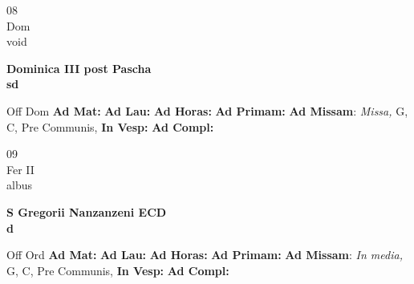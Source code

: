 \documentclass[10pt, openany]{book}
\begin{document}
    \begin{center}
        \begin{minipage}{3.5in}
            \vspace{2em}
            \begin{minipage}{0.5in}
                {\Huge 08} \\
                {\normalsize Dom} \\
                {\normalsize void}
            \end{minipage}
            \begin{minipage}{3.0in}
                \textbf{ \large Dominica III post Pascha \\
                \textnormal{\normalsize sd}} \\ 
            \end{minipage}
            \begin{justify}Off Dom
                \textbf{Ad Mat: }
                \textbf{Ad Lau: }
                \textbf{Ad Horas: }
                \textbf{Ad Primam: }\textbf{Ad Missam}: \textit{Missa,} G, C, Pre Communis,  
                \textbf{In Vesp: }
                \textbf{Ad Compl: }
            \end{justify}
        \end{minipage}
    \end{center}

    \begin{center}
        \begin{minipage}{3.5in}
            \vspace{2em}
            \begin{minipage}{0.5in}
                {\Huge 09} \\
                {\normalsize Fer II} \\
                {\normalsize albus}
            \end{minipage}
            \begin{minipage}{3.0in}
                \textbf{ \large S Gregorii Nanzanzeni ECD \\
                \textnormal{\normalsize d}} \\ 
            \end{minipage}
            \begin{justify}Off Ord
                \textbf{Ad Mat: }
                \textbf{Ad Lau: }
                \textbf{Ad Horas: }
                \textbf{Ad Primam: }\textbf{Ad Missam}: \textit{In media,} G, C, Pre Communis,  
                \textbf{In Vesp: }
                \textbf{Ad Compl: }
            \end{justify}
        \end{minipage}
    \end{center}
\end{document}
